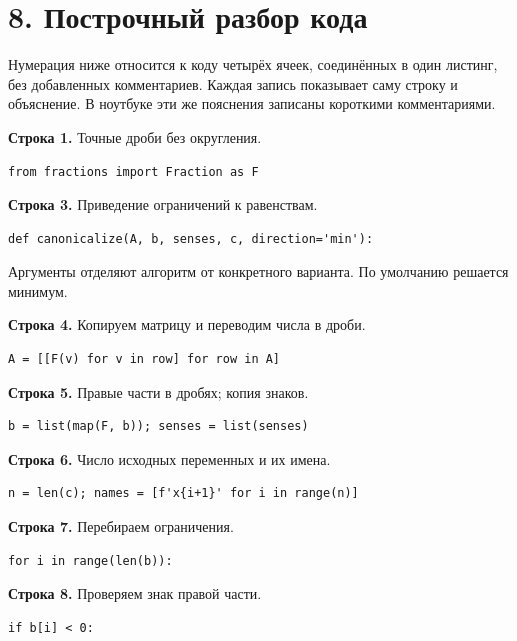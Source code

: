 \documentclass[12pt,a4paper]{article}
\begin{document}
\section*{8. Построчный разбор кода}
Нумерация ниже относится к коду четырёх ячеек, соединённых в один листинг,
без добавленных комментариев. Каждая запись показывает саму строку
и объяснение. В ноутбуке эти же пояснения записаны короткими комментариями.
\par\textbf{Строка 1.} Точные дроби без округления.
\begin{Verbatim}[fontsize=\small,breaklines=true,breakanywhere=true]
from fractions import Fraction as F
\end{Verbatim}
\par\textbf{Строка 3.} Приведение ограничений к равенствам.
\begin{Verbatim}[fontsize=\small,breaklines=true,breakanywhere=true]
def canonicalize(A, b, senses, c, direction='min'):
\end{Verbatim}
Аргументы отделяют алгоритм от конкретного варианта. По умолчанию решается минимум.
\par\textbf{Строка 4.} Копируем матрицу и переводим числа в дроби.
\begin{Verbatim}[fontsize=\small,breaklines=true,breakanywhere=true]
    A = [[F(v) for v in row] for row in A]
\end{Verbatim}
\par\textbf{Строка 5.} Правые части в дробях; копия знаков.
\begin{Verbatim}[fontsize=\small,breaklines=true,breakanywhere=true]
    b = list(map(F, b)); senses = list(senses)
\end{Verbatim}
\par\textbf{Строка 6.} Число исходных переменных и их имена.
\begin{Verbatim}[fontsize=\small,breaklines=true,breakanywhere=true]
    n = len(c); names = [f'x{i+1}' for i in range(n)]
\end{Verbatim}
\par\textbf{Строка 7.} Перебираем ограничения.
\begin{Verbatim}[fontsize=\small,breaklines=true,breakanywhere=true]
    for i in range(len(b)):
\end{Verbatim}
\par\textbf{Строка 8.} Проверяем знак правой части.
\begin{Verbatim}[fontsize=\small,breaklines=true,breakanywhere=true]
        if b[i] < 0:
\end{Verbatim}
\end{document}
